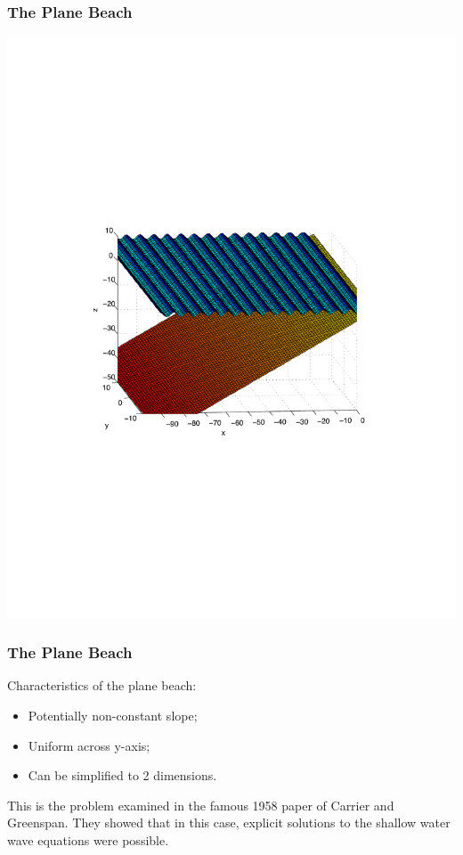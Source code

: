 \documentclass[xcolor=dvipsnames]{beamer}
\begin{document}
\begin{frame}
\frametitle{The Plane Beach}
\includegraphics[width=\linewidth]{planebeach.pdf}
\end{frame}

\begin{frame}
\frametitle{The Plane Beach}
Characteristics of the plane beach:
\begin{itemize}
\item Potentially non-constant slope;
\item Uniform across y-axis;
\item Can be simplified to 2 dimensions.
\end{itemize}
This is the problem examined in the famous 1958 paper of Carrier and Greenspan. They showed that in this case, explicit solutions to the shallow water wave equations were possible.
\end{frame}
\end{document}

